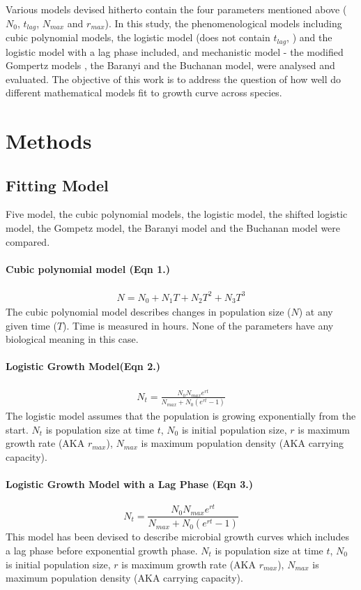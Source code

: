 \documentclass[a4paper,11pt]{article}
\theoremstyle{definition}
\begin{document}
\begin{linenumbers}
Various models devised hitherto contain the four parameters mentioned above ($N_{0}$, $t_{lag}$, $N_{max}$ and $r_{max}$). In this study, the phenomenological models including cubic polynomial models, the logistic model (does not contain $t_{lag}$, \citep{verhulst1838notice}) and the logistic model with a lag phase included, and mechanistic model - the modified Gompertz models \citep{zwietering1990modeling}, the Baranyi and the Buchanan model, were analysed and evaluated. The objective of this work is to address the question of how well do different mathematical models fit to growth curve across species.


\section{Methods}
\subsection{Fitting Model}
Five model, the cubic polynomial models, the logistic model, the shifted logistic model, the Gompetz model, the Baranyi model and the Buchanan model were compared.
\paragraph{Cubic polynomial model (Eqn 1.)}
\begin{align}
    N = N_0 + N_1 T + N_2 T^2 + N_3 T^3
\end{align}
The cubic polynomial model describes changes in population size ($N$) at any given time ($T$). Time is measured in hours. None of the parameters have any biological meaning in this case. 
\paragraph{Logistic Growth Model(Eqn 2.)}
\begin{align}
    N_t = \frac{N_0 N_{max} e^{rt}}{N_{max}+N_0(e^{rt}-1)}
\end{align}
The logistic model assumes that the population is growing exponentially from the start. $N_t$ is population size at time $t$, $N_0$ is initial population size, $r$ is maximum growth rate (AKA $r_{max}$), $N_{max}$ is maximum population density (AKA carrying capacity).
\paragraph{Logistic Growth Model with a Lag Phase (Eqn 3.)}
\begin{equation}
    N_t = \frac{N_0 N_{max} e^{rt}}{N_{max}+N_0(e^{rt}-1)}
\end{equation}
This model has been devised to describe microbial growth curves which includes a lag phase before exponential growth phase. $N_t$ is population size at time $t$, $N_0$ is initial population size, $r$ is maximum growth rate (AKA $r_{max}$), $N_{max}$ is maximum population density (AKA carrying capacity).

\end{linenumbers}
\end{document}
